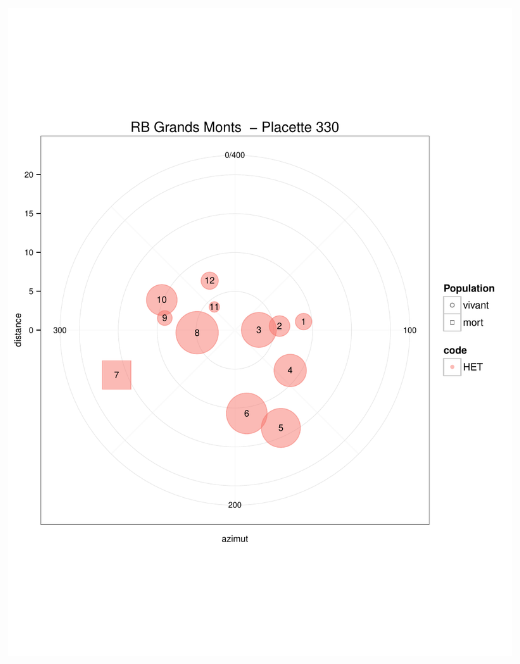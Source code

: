 \documentclass[a4paper]{book}\usepackage[]{graphicx}\usepackage[]{color}
\makeatletter
\def\maxwidth{ %
  \ifdim\Gin@nat@width>\linewidth
    \linewidth
  \else
    \Gin@nat@width
  \fi
}
\newenvironment{knitrout}{}{} %
\makeatother
\begin{document}
\begin{knitrout}
{\centering \includegraphics[width=\maxwidth]{Figures/PlanArbres-31} 

}





\end{knitrout}
\end{document}
